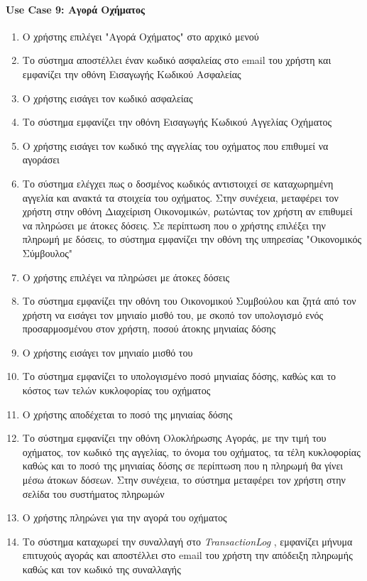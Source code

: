 \documentclass{../ol-softwaremanual}
\begin{document}
	
	\paragraph{\en Use Case 9: \gr Αγορά Οχήματος\gr}
	
	\begin{enumerate}
		\item Ο χρήστης επιλέγει \en"\gr Αγορά Οχήματος\en" \gr στο αρχικό μενού
		\item Το σύστημα αποστέλλει έναν κωδικό ασφαλείας στο \en email \gr του χρήστη και εμφανίζει την οθόνη Εισαγωγής Κωδικού Ασφαλείας
		\item Ο χρήστης εισάγει τον κωδικό ασφαλείας		
		\item Το σύστημα εμφανίζει την οθόνη Εισαγωγής Κωδικού Αγγελίας Οχήματος
		\item Ο χρήστης εισάγει τον κωδικό της αγγελίας	του οχήματος που επιθυμεί να αγοράσει
		\item Το σύστημα ελέγχει πως ο δοσμένος κωδικός αντιστοιχεί σε καταχωρημένη αγγελία και ανακτά τα στοιχεία του οχήματος. Στην συνέχεια, μεταφέρει τον χρήστη στην οθόνη Διαχείριση Οικονομικών, ρωτώντας τον χρήστη αν επιθυμεί να πληρώσει με άτοκες δόσεις. Σε περίπτωση που ο χρήστης επιλέξει την πληρωμή με δόσεις, το σύστημα εμφανίζει την οθόνη της υπηρεσίας \en"\gr Οικονομικός Σύμβουλος\en"\gr
		\item Ο χρήστης επιλέγει να πληρώσει με άτοκες δόσεις
		\item Το σύστημα εμφανίζει την οθόνη του Οικονομικού Συμβούλου και ζητά από τον χρήστη να εισάγει τον μηνιαίο μισθό του, με σκοπό τον υπολογισμό ενός προσαρμοσμένου στον χρήστη, ποσού άτοκης μηνιαίας δόσης
		\item Ο χρήστης εισάγει τον μηνιαίο μισθό του
		\item Το σύστημα εμφανίζει το υπολογισμένο ποσό μηνιαίας δόσης, καθώς και το κόστος των τελών κυκλοφορίας του οχήματος
		\item Ο χρήστης αποδέχεται το ποσό της μηνιαίας δόσης
		\item Το σύστημα εμφανίζει την οθόνη Ολοκλήρωσης Αγοράς, με την τιμή του οχήματος, τον κωδικό της αγγελίας, το όνομα του οχήματος, τα τέλη κυκλοφορίας καθώς και το ποσό της μηνιαίας δόσης σε περίπτωση που η πληρωμή θα γίνει μέσω άτοκων δόσεων. Στην συνέχεια, το σύστημα μεταφέρει τον χρήστη στην σελίδα του συστήματος πληρωμών
		\item Ο χρήστης πληρώνει για την αγορά του οχήματος
		\item Το σύστημα καταχωρεί την συναλλαγή στο \en \textit{TransactionLog} \gr, εμφανίζει μήνυμα επιτυχούς αγοράς και αποστέλλει στο \en email \gr του χρήστη την απόδειξη πληρωμής καθώς και τον κωδικό της συναλλαγής
	\end{enumerate}
	
\end{document}

